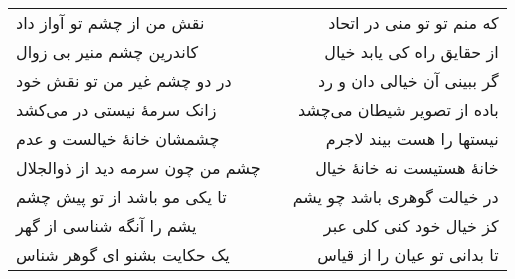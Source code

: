 \begin{center}
\begin{longtable}{l p{0.5cm} r}
نقش من از چشم تو آواز داد
&&
که منم تو تو منی در اتحاد
\\
کاندرین چشم منیر بی زوال
&&
از حقایق راه کی یابد خیال
\\
در دو چشم غیر من تو نقش خود
&&
گر ببینی آن خیالی دان و رد
\\
زانک سرمهٔ نیستی در می‌کشد
&&
باده از تصویر شیطان می‌چشد
\\
چشمشان خانهٔ خیالست و عدم
&&
نیستها را هست بیند لاجرم
\\
چشم من چون سرمه دید از ذوالجلال
&&
خانهٔ هستیست نه خانهٔ خیال
\\
تا یکی مو باشد از تو پیش چشم
&&
در خیالت گوهری باشد چو یشم
\\
یشم را آنگه شناسی از گهر
&&
کز خیال خود کنی کلی عبر
\\
یک حکایت بشنو ای گوهر شناس
&&
تا بدانی تو عیان را از قیاس
\\
\end{longtable}
\end{center}
